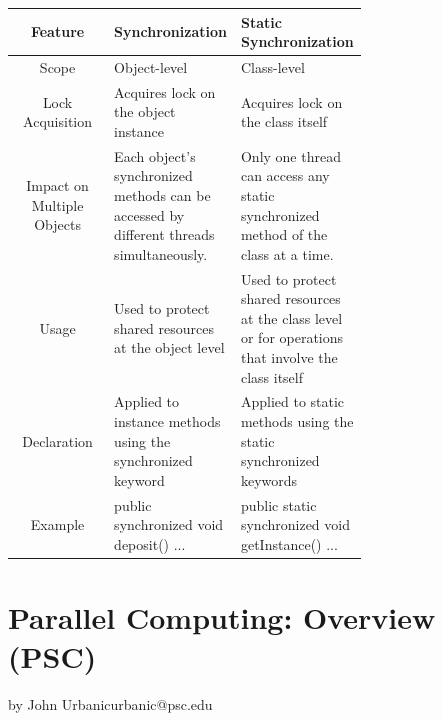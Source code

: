 \documentclass[12pt, a4paper]{book}
\begin{document}
\begin{tabular}{c|p{0.35\linewidth}|p{0.35\linewidth}}
    Feature                    & \textbf{Synchronization}                                                                & \textbf{Static Synchronization}                                                                     \\
    \hline
    Scope                      & Object-level                                                                            & Class-level                                                                                         \\
    \hline
    Lock Acquisition           & Acquires lock on the object instance                                                    & Acquires lock on the class itself                                                                   \\
    \hline
    Impact on Multiple Objects & Each object's synchronized methods can be accessed by different threads simultaneously. & Only one thread can access any static synchronized method of the class at a time.                   \\
    \hline
    Usage                      & Used to protect shared resources at the object level                                    & Used to protect shared resources at the class level or for operations that involve the class itself \\
    \hline
    Declaration                & Applied to instance methods using the synchronized keyword                              & Applied to static methods using the static synchronized keywords                                    \\
    \hline
    Example                    & public synchronized void deposit() { ... }                                              & public static synchronized void getInstance() { ... }                                               \\
\end{tabular}
\chapter{Parallel Computing: Overview (PSC)}{by John Urbanicurbanic@psc.edu}
\end{document}
